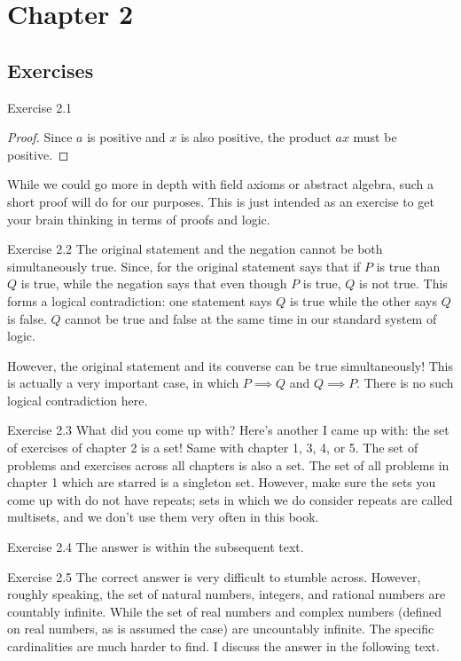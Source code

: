 \section{Chapter 2}
\subsection{Exercises}
\begin{sol}{Exercise 2.1}
\begin{proof}
Since $a$ is positive and $x$ is also positive, the product $ax$ must be positive. 
\end{proof}

While we could go more in depth with field axioms or abstract algebra, such a short proof will do for our purposes. This is just intended as an exercise to get your brain thinking in terms of proofs and logic.
\end{sol}

\begin{sol}{Exercise 2.2}
The original statement and the negation cannot be both simultaneously true. Since, for the original statement says that if $P$ is true than $Q$ is true, while the negation says that even though $P$ is true, $Q$ is not true. This forms a logical contradiction: one statement says $Q$ is true while the other says $Q$ is false. $Q$ cannot be true and false at the same time in our standard system of logic.

However, the original statement and its converse can be true simultaneously! This is actually a very important case, in which $P \implies Q$ and $Q \implies P$. There is no such logical contradiction here. 
\end{sol}


\begin{sol}{Exercise 2.3}
What did you come up with? Here's another I came up with: the set of exercises of chapter 2 is a set! Same with chapter 1, 3, 4, or 5. The set of problems and exercises across all chapters is also a set. The set of all problems in chapter 1 which are starred is a singleton set. However, make sure the sets you come up with do not have repeats; sets in which we do consider repeats are called multisets, and we don't use them very often in this book. 
\end{sol}

\begin{sol}{Exercise 2.4}
The answer is within the subsequent text. 
\end{sol}


\begin{sol}{Exercise 2.5}
The correct answer is very difficult to stumble across. However, roughly speaking, the set of natural numbers, integers, and rational numbers are countably infinite. While the set of real numbers and complex numbers (defined on real numbers, as is assumed the case) are uncountably infinite. The specific cardinalities are much harder to find. I discuss the answer in the following text.
\end{sol}

